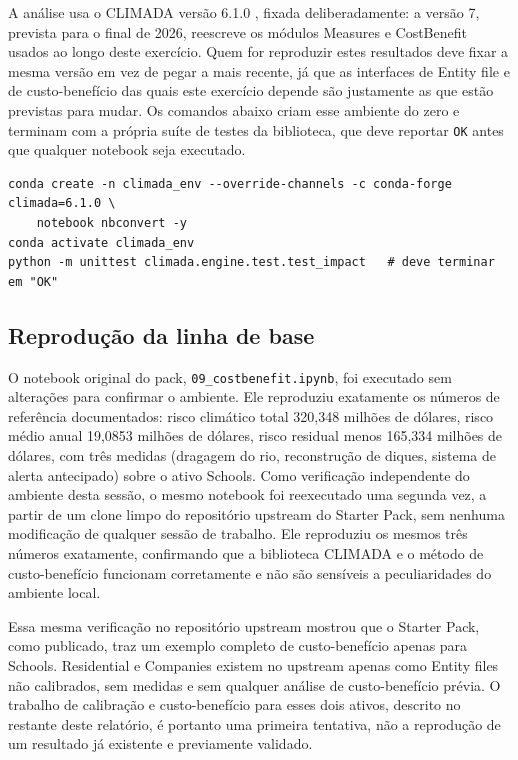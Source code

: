 \documentclass[11pt]{article}
\begin{document}
A análise usa o CLIMADA versão 6.1.0 \citep{climada2026}, fixada deliberadamente: a versão
7, prevista para o final de 2026, reescreve os módulos Measures e CostBenefit usados ao
longo deste exercício. Quem for reproduzir estes resultados deve fixar a mesma versão em vez
de pegar a mais recente, já que as interfaces de Entity file e de custo-benefício das quais
este exercício depende são justamente as que estão previstas para mudar. Os comandos abaixo
criam esse ambiente do zero e terminam com a própria suíte de testes da biblioteca, que deve
reportar \texttt{OK} antes que qualquer notebook seja executado.

\begin{verbatim}
conda create -n climada_env --override-channels -c conda-forge climada=6.1.0 \
    notebook nbconvert -y
conda activate climada_env
python -m unittest climada.engine.test.test_impact   # deve terminar em "OK"
\end{verbatim}

\subsection{Reprodução da linha de base}
\label{sec:baseline}

O notebook original do pack, \texttt{09\_costbenefit.ipynb}, foi executado sem alterações
para confirmar o ambiente. Ele reproduziu exatamente os números de referência
documentados: risco climático total 320,348 milhões de dólares, risco médio anual 19,0853
milhões de dólares, risco residual menos 165,334 milhões de dólares, com três medidas
(dragagem do rio, reconstrução de diques, sistema de alerta antecipado) sobre o ativo
Schools. Como verificação independente do ambiente desta sessão, o mesmo notebook foi
reexecutado uma segunda vez, a partir de um clone limpo do repositório upstream do Starter
Pack, sem nenhuma modificação de qualquer sessão de trabalho. Ele reproduziu os mesmos três
números exatamente, confirmando que a biblioteca CLIMADA e o método de custo-benefício
funcionam corretamente e não são sensíveis a peculiaridades do ambiente local.

Essa mesma verificação no repositório upstream mostrou que o Starter Pack, como publicado,
traz um exemplo completo de custo-benefício apenas para Schools. Residential e Companies
existem no upstream apenas como Entity files não calibrados, sem medidas e sem qualquer
análise de custo-benefício prévia. O trabalho de calibração e custo-benefício para esses
dois ativos, descrito no restante deste relatório, é portanto uma primeira tentativa, não a
reprodução de um resultado já existente e previamente validado.
\end{document}
